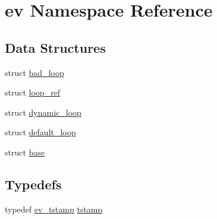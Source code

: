 \hypertarget{namespaceev}{\section{ev \-Namespace \-Reference}
\label{namespaceev}
}
\subsection*{\-Data \-Structures}
\begin{DoxyCompactItemize}
\item 
struct \hyperlink{structev_1_1bad__loop}{bad\-\_\-loop}
\item 
struct \hyperlink{structev_1_1loop__ref}{loop\-\_\-ref}
\item 
struct \hyperlink{structev_1_1dynamic__loop}{dynamic\-\_\-loop}
\item 
struct \hyperlink{structev_1_1default__loop}{default\-\_\-loop}
\item 
struct \hyperlink{structev_1_1base}{base}
\end{DoxyCompactItemize}
\subsection*{\-Typedefs}
\begin{DoxyCompactItemize}
\item 
typedef \hyperlink{ev_8h_add71e34ce2b04bbf7eb6f31a850814e8}{ev\-\_\-tstamp} \hyperlink{namespaceev_a9853823b701944a8a5ce179d10a24b97}{tstamp}
\end{DoxyCompactItemize}
